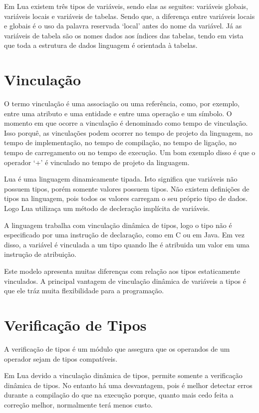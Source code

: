 \documentclass[
12pt, %
openright, %
oneside, %
a4paper, %
english, %
brazil, %
]{abntex2}
\begin{document}
Em Lua existem três tipos de variáveis, sendo elas as seguites: variáveis globais, variáveis locais e variáveis de tabelas. Sendo que, a diferença entre variáveis locais e globais é o uso da palavra reservada `local' antes do nome da variável. Já as variáveis de tabela são os nomes dados aos índices das tabelas, tendo em vista que toda a estrutura de dados linguagem é orientada à tabelas.

\section{Vinculação}
O termo vinculação é uma associação ou uma referência, como, por exemplo, entre uma atributo e uma entidade e entre uma operação e um símbolo. O momento em que ocorre a vinculação é denominado como tempo de vinculação. Isso porquê, as vinculações podem ocorrer no tempo de projeto da linguagem, no tempo de implementação, no tempo de compilação, no tempo de ligação, no tempo de carregamento ou no tempo de execução. Um bom exemplo disso é que o operador `+' é vinculado no tempo de projeto da linguagem.

Lua é uma linguagem dinamicamente tipada. Isto significa que variáveis não possuem tipos, porém somente valores possuem tipos. Não existem definições de tipos na linguagem, pois todos os valores carregam o seu próprio tipo de dados. Logo Lua utilizaça um método de decleração implícita de variáveis.

A linguagem trabalha com vinculação dinâmica de tipos, logo o tipo não é especificado por uma instrução de declaração, como em C ou em Java. Em vez disso, a variável é vinculada a um tipo quando lhe é atribuida um valor em uma instrução de atribuição.

Este modelo apresenta muitas diferenças com relação aos tipos estaticamente vinculados. A principal vantagem de vinculação dinâmica de variáveis a tipos é que ele tráz muita flexibilidade para a programação.

\section{Verificação de Tipos}
A verificação de tipos é um módulo que assegura que os operandos de um operador sejam de tipos compatíveis.

Em Lua devido a vinculação dinâmica de tipos, permite somente a verificação dinâmica de tipos. No entanto há uma desvantagem, pois é melhor detectar erros durante a compilação do que na execução porque, quanto mais cedo feita a correção melhor, normalmente terá menos custo.
\end{document}
